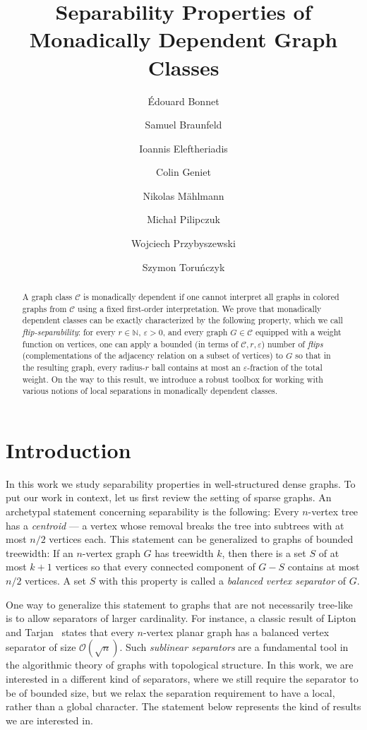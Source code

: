 \documentclass[a4paper,UKenglish,cleveref, autoref, thm-restate]{lipics-v2021}
\title{Separability Properties of Monadically Dependent Graph Classes}
\author{\'{E}douard Bonnet}{CNRS, ENS de Lyon, Université Claude Bernard Lyon 1, LIP UMR 5668, Lyon, France}{edouard.bonnet@ens-lyon.fr}{https://orcid.org/0000-0002-1653-5822}{}
\author{Samuel Braunfeld}{Computer Science Institute, Charles University, Prague, Czech Republic; and
the Czech Academy of Sciences, Institute of Computer Science, Pod Vod\'{a}renskou v\v{e}\v{z}\'{\i} 2, 182 00 Prague, Czech Republic}{sbraunfeld@iuuk.mff.cuni.cz}{https://orcid.org/0000-0003-3531-9970}{}
\author{Ioannis Eleftheriadis}{Department of Computer Science and Technology, University of Cambridge, UK}{ie257@cam.ac.uk}{https://orcid.org/0000-0003-4764-8894}{}
\author{Colin Geniet}{Discrete Mathematics Group, Institute for Basic Science (IBS), Daejeon, South Korea}{colin@ibs.re.kr}{https://orcid.org/0000-0003-4034-7634}{}
\author{Nikolas Mählmann}{University of Bremen, Germany}{maehlmann@uni-bremen.de}{https://orcid.org/0000-0003-3657-7736}{}
\author{Micha{\l} Pilipczuk}{University of Warsaw, Poland}{michal.pilipczuk@mimuw.edu.pl}{https://orcid.org/0000-0001-7891-1988}{}
\author{Wojciech Przybyszewski}{University of Warsaw, Poland}{przybyszewski@mimuw.edu.pl}{https://orcid.org/0000-0003-1158-9925}{}
\author{Szymon Toru{\'n}czyk}{University of Warsaw, Poland}{szymtor@mimuw.edu.pl}{https://orcid.org/0000-0002-1130-9033}{}
\newcommand{\eps}{\varepsilon}
\newcommand{\N}[0]{\mathrm{\mathbb{N}}}
\newcommand{\CC}{\mathcal{C}}
\newcommand{\Cc}{\CC}
\newcommand{\Oh}{\mathcal{O}}
\begin{document}
\maketitle


\begin{abstract}
 A graph class $\CC$ is monadically dependent if one cannot interpret all graphs in colored graphs from $\CC$ using a fixed first-order interpretation. We prove that monadically dependent classes can be exactly characterized by the following property, which we call {\em{flip-separability}}: for every $r\in \N$, $\eps>0$, and every graph $G\in \Cc$ equipped with a weight function on vertices, one can apply a bounded (in terms of $\Cc,r,\eps$) number of {\em{flips}} (complementations of the adjacency relation on a subset of vertices) to $G$ so that in the resulting graph, every radius-$r$ ball contains at most an $\eps$-fraction of the total weight. On the way to this result, we introduce a robust toolbox for working with various notions of local separations in monadically dependent classes.
\end{abstract}
 



\section{Introduction}\label{sec:intro}


In this work we study separability properties in well-structured dense graphs. To put our work in context, let us first review the setting of sparse graphs.
An archetypal statement concerning separability is the following: Every $n$-vertex tree has a {\em{centroid}} --- a vertex whose removal breaks the tree into subtrees with at most $n/2$ vertices each. This statement can be generalized to graphs of bounded treewidth: If an $n$-vertex graph $G$ has treewidth $k$, then there is a set $S$ of at most $k+1$ vertices so that every connected component of $G-S$ contains at most $n/2$ vertices. A set $S$ with this property is called a {\em{balanced vertex separator}} of $G$.

One way to generalize this statement to graphs that are not necessarily tree-like is to allow separators of larger cardinality. For instance, a classic result of Lipton and Tarjan~\cite{LiptonT80} states that every $n$-vertex planar graph has a balanced vertex separator of size $\Oh(\sqrt{n})$. Such {\em{sublinear separators}} are a fundamental tool in the algorithmic theory of graphs with topological structure. In this work, we are interested in a different kind of separators, where we still require the separator to be of bounded size, but we relax the separation requirement to have a local, rather than a global character. The statement below represents the kind of results we are interested in.
\end{document}
